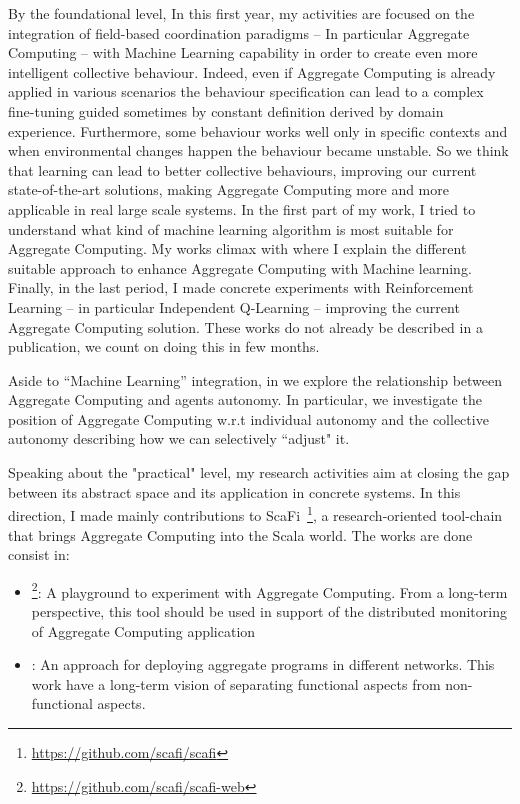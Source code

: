 \documentclass[12pt]{article}
\begin{document}
By the foundational level, In this first year, my activities are focused on the integration of field-based coordination paradigms 
 -- In particular Aggregate Computing -- with Machine Learning capability 
 in order to create even more intelligent collective behaviour.
%
Indeed, even if Aggregate Computing is already applied in various scenarios
 the behaviour specification can lead to
 a complex fine-tuning guided sometimes by constant definition derived by domain experience.
%
Furthermore, some behaviour works well only in specific contexts and when environmental
 changes happen the behaviour became unstable.
%
So we think that learning can lead to better collective behaviours, 
 improving our current state-of-the-art solutions, making Aggregate 
 Computing more and more applicable in real large scale systems.
%
In the first part of my work, I tried to understand what 
 kind of machine learning algorithm is most suitable for Aggregate Computing.
%
My works climax with \textit{} where I explain the different suitable approach
 to enhance Aggregate Computing with Machine learning.
%
Finally, in the last period, I made concrete experiments with 
 Reinforcement Learning -- in particular Independent Q-Learning -- improving the current Aggregate Computing solution. 
 These works do not already be described in a publication,
 we count on doing this in few months.

Aside to ``Machine Learning'' integration, in \textit{} we explore the relationship
 between Aggregate Computing and agents autonomy. In particular, we investigate the position of Aggregate Computing 
 w.r.t individual autonomy and the collective autonomy describing how we can selectively ``adjust" it. 

Speaking about the "practical" level, my research activities aim at closing the gap between
 its abstract space and its application in concrete systems. 
%
In this direction, I made mainly contributions to ScaFi~\cite{scafi}\footnote{\url{https://github.com/scafi/scafi}}, 
 a research-oriented tool-chain that brings Aggregate Computing into the Scala world. The works are done consist in:

\begin{itemize}
  \item \textit{}\footnote{\url{https://github.com/scafi/scafi-web}}: 
	A playground to experiment with Aggregate Computing. From a long-term perspective, this tool should be used in support of
  the distributed monitoring of Aggregate Computing application
  \item \textit{}: 
	An approach for deploying aggregate programs in different networks. This work have a long-term vision of separating functional aspects from non-functional aspects.
\end{itemize}
\end{document}
